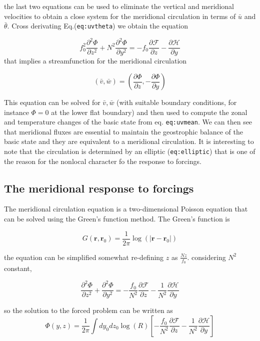 the last two equations can be used to eliminate the vertical and
meridional velocities to obtain a close system for the meridional
circulation in terms of \(\bar{u}\) and \(\bar{\theta}\). Cross
derivating Eq.(\texttt{eq:uvtheta}) we obtain the equation

\[
f_0^2 \frac{\partial^{2} \Phi}{\partial z^{2}} + N^2 \frac{\partial^{2} \Phi}{\partial y^2} =
-f_0\frac{\partial \mathcal{F}}{\partial z} - \frac{\partial \mathcal{H}}{\partial y}
\]
that implies a streamfunction for the meridional circulation

\[(\bar{v},\bar{w}) = \left( \frac{\partial \Phi}{\partial z},-\frac{\partial \Phi}{\partial y}\right)\]

This equation can be solved for \(\bar{v},\bar{w}\) (with suitable
boundary conditions, for instance \(\Phi = 0\) at the lower flat
boundary) and then used to compute the zonal and temperature changes of
the basic state from eq. \texttt{eq:uvmean}. We can then see that
meridional fluxes are essential to maintain the geostrophic balance of
the basic state and they are equivalent to a meridional circulation. It
is interesting to note that the circulation is determined by an elliptic
(\texttt{eq:elliptic}) that is one of the reason for the nonlocal
character fo the response to forcings.

\subsection{The meridional response to
forcings}\label{the-meridional-response-to-forcings}

The meridional circulation equation is a two-dimensional Poisson
equation that can be solved using the Green's function method. The
Green's function is

\[G(\mathbf{r},\mathbf{r}_0) = \frac{1}{2\pi} \log(| \mathbf{r}-\mathbf{r}_0|)\]

the equation can be simplified somewhat re-defining \(z\) as
\(\frac{ N z}{f_0}\). considering \(N^2\) constant,

\[
\frac{\partial^{2} \Phi}{\partial z^{2}} + \frac{\partial^{2} \Phi}{\partial y^2} =
-\frac{f_0}{N^2}\frac{\partial \mathcal{F}}{\partial z} - \frac{1}{N^2}\frac{\partial \mathcal{H}}{\partial y}
\]

so the solution to the forced problem can be written as
\[
\Phi(y,z) = \frac{1}{2\pi}\int dy_0 dz_0 \log( R) 
\left[ -\frac{f_0}{N^2}\frac{\partial \mathcal{F}}{\partial z} - \frac{1}{N^2}\frac{\partial \mathcal{H}}{\partial y} \right]
\]

